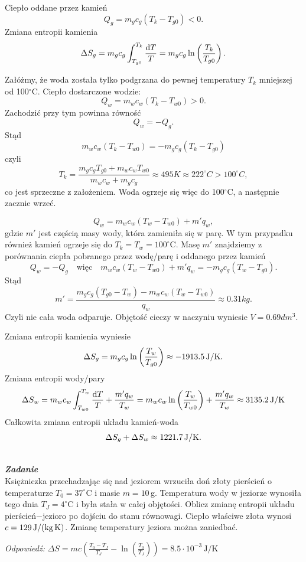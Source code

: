 \documentclass[11pt,a4paper]{article}
\renewcommand{\t}[1]{\textrm{#1}}
\newcommand{\dd}{{{\rm d}}}
\newcounter{zadanie}\newcommand{\zadanie}[1][]{\addtocounter{zadanie}{1} ~\\  {\bf \emph{Zadanie \arabic{zadanie} #1 }} \\}
\renewcommand{\t}[1]{\textrm{#1}}
\begin{document}
Ciepło oddane przez kamień
$$
Q_g = m_g c_g (T_k - T_{g0})< 0.
$$
Zmiana entropii kamienia
$$
\Delta S_g = m_g c_g\int_{T_{g0}}^{T_k}\frac{\dd T}{T} = m_g c_g \ln\left(\frac{T_k}{T_{g0}}\right).
$$

Załóżmy, że woda została tylko podgrzana do pewnej temperatury $T_k$ mniejszej od 100$^\circ$C.
Ciepło dostarczone wodzie:
$$
Q_w = m_w c_w (T_k-T_{w0}) > 0.
$$
Zachodzić przy tym powinna równość
$$
Q_w = -Q_g.
$$
Stąd
$$
m_w c_w (T_k-T_{w0}) = -m_g c_g (T_k - T_{g0})
$$
czyli
$$
T_k = \frac{m_g c_g T_{g0} + m_w c_w T_{w0}}{m_w c_w + m_g c_g} \approx 495 K \approx 222^\circ C
> 100^\circ C,
$$
co jest sprzeczne z założeniem. Woda ogrzeje się więc do 100$^\circ$C,
a następnie zacznie wrzeć.

$$
Q_w = m_w c_w (T_w-T_{w0}) + m'q_w,
$$
gdzie $m'$ jest częścią masy wody, która zamieniła się w parę.
W tym przypadku również kamień ogrzeje się do $T_k = T_w = 100^\circ$C.
Masę $m'$ znajdziemy z porównania ciepła pobranego przez wodę/parę i oddanego przez 
kamień
$$
Q_w = -Q_g \quad \textrm{więc} \quad
m_w c_w (T_w-T_{w0}) + m'q_w = -m_g c_g (T_w - T_{g0}).
$$ 
Stąd
$$
m'= \frac{m_g c_g (T_{g0} - T_w) -  m_w c_w (T_w-T_{w0}) }{q_w} \approx 0.31 kg.
$$
Czyli nie cała woda odparuje. Objętość cieczy w naczyniu wyniesie $V=0.69 dm^3$.

Zmiana entropii kamienia wyniesie
$$
\Delta S_g = m_g c_g \ln\left(\frac{T_w}{T_{g0}}\right)\approx-1913.5 \, {\rm J/K}.
$$
Zmiana entropii wody/pary
$$
\Delta S_w = m_w c_w\int_{T_{w0}}^{T_w}\frac{\dd T}{T} 
+ \frac{m'q_w}{T_w} 
= m_w c_w \ln\left(\frac{T_w}{T_{w0}}\right)+ \frac{m'q_w}{T_w}\approx 3135.2\, {\rm J/K}
$$
Całkowita zmiana entropii układu kamień-woda
$$
\Delta S_g + \Delta S_w \approx 1221.7 \, {\rm J/K}.
$$

\pagebreak
\zadanie
Księżniczka przechadzając się nad jeziorem wrzuciła doń złoty pierścień o temperaturze $T_0 = 37^\circ$C
i masie $m = 10\,$g. Temperatura wody w jeziorze wynosiła tego dnia $T_J = 4^\circ$C i była stała
w całej objętości. Oblicz zmianę entropii układu pierścień$-$jezioro po dojściu do stanu
równowagi. Ciepło właściwe złota wynosi $c=129\,{\rm J/(kg\, K)}$. Zmianę temperatury jeziora
można zaniedbać.
\newline

\noindent
\emph{Odpowiedź:}
$\Delta S = mc \left( \frac{T_0 - T_J}{T_J}  - \ln\left(\frac{T_0}{T_J}\right)  \right) = 8.5 \cdot 10^{-3}\, \t{J/K}$
\end{document}
